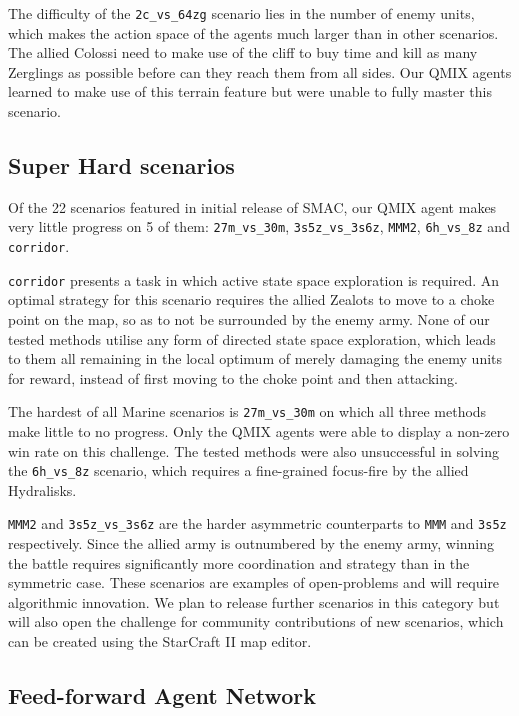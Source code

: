 The difficulty of the \texttt{2c\_vs\_64zg} scenario lies in the number of enemy units, which makes the action space of the agents much larger than in other scenarios. The allied Colossi need to make use of the cliff to buy time and kill as many Zerglings as possible before can they reach them from all sides. Our QMIX agents learned to make use of this terrain feature but were unable to fully master this scenario. 

\subsection{Super Hard scenarios}


Of the 22 scenarios featured in initial release of SMAC, our QMIX agent makes very little progress on 5 of them: \texttt{27m\_vs\_30m}, \texttt{3s5z\_vs\_3s6z}, \texttt{MMM2}, \texttt{6h\_vs\_8z} and \texttt{corridor}.

\texttt{corridor} presents a task in which active state space exploration is required. An optimal strategy for this scenario requires the allied Zealots to move to a choke point on the map, so as to not be surrounded by the enemy army. None of our tested methods utilise any form of directed state space exploration, which leads to them all remaining in the local optimum of merely damaging the enemy units for reward, instead of first moving to the choke point and then attacking.  

The hardest of all Marine scenarios is \texttt{27m\_vs\_30m} on which all three methods make little to no progress. Only the QMIX agents were able to display a non-zero win rate on this challenge. The tested methods were also unsuccessful in solving the \texttt{6h\_vs\_8z} scenario, which requires a fine-grained focus-fire by the allied Hydralisks. 

\texttt{MMM2} and \texttt{3s5z\_vs\_3s6z} are the harder asymmetric counterparts to \texttt{MMM} and \texttt{3s5z} respectively. Since the allied army is outnumbered by the enemy army, winning the battle requires significantly more coordination and strategy than in the symmetric case. These scenarios are examples of open-problems and will require algorithmic innovation. We plan to release further scenarios in this category but will also open the challenge for community contributions of new scenarios, which can be created using the StarCraft II map editor. %

\subsection{Feed-forward Agent Network}\label{appendix:FF_agents}

